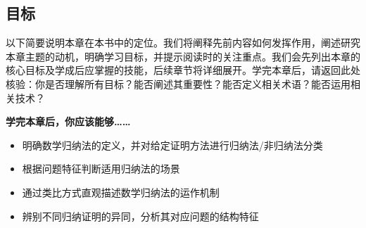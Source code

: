 \subsection{目标}

以下简要说明本章在本书中的定位。我们将阐释先前内容如何发挥作用，阐述研究本章主题的动机，明确学习目标，并提示阅读时的关注重点。我们会先列出本章的核心目标及学成后应掌握的技能，后续章节将详细展开。学完本章后，请返回此处核验：你是否理解所有目标？能否阐述其重要性？能否定义相关术语？能否运用相关技术？

\textbf{学完本章后，你应该能够……}

\begin{itemize}
    \item 明确数学归纳法的定义，并对给定证明方法进行归纳法/非归纳法分类
    \item 根据问题特征判断适用归纳法的场景
    \item 通过类比方式直观描述数学归纳法的运作机制
    \item 辨别不同归纳证明的异同，分析其对应问题的结构特征
\end{itemize}
